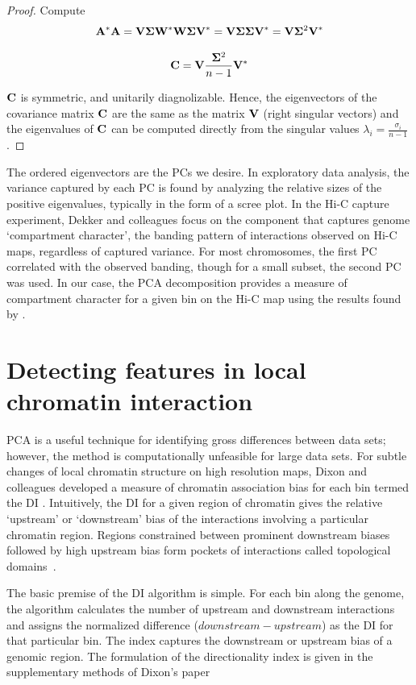 \begin{proof}
  Compute
  \[
    \mathbf{A}^*\mathbf{A} =
    \mathbf{V\Sigma}\mathbf{W}^*\mathbf{W\Sigma}\mathbf{V}^* =
    \mathbf{V\Sigma\Sigma}\mathbf{V}^* =
    \mathbf{V}\mathbf{\Sigma}^2\mathbf{V}^*
  \]

  \[
    \mathbf{C} = \mathbf{V}\frac{\mathbf{\Sigma}^2}{n - 1}\mathbf{V}^*
  \]

  $\mathbf{C}$ is symmetric, and unitarily diagnolizable.  Hence, the eigenvectors of the covariance matrix $\mathbf{C}$ are the same as the
  matrix $\mathbf{V}$ (right singular vectors) and the eigenvalues of $\mathbf{C}$ can be computed directly from the singular values
  $\lambda_i = \frac{\sigma_i}{n - 1}$.
\end{proof}

The ordered eigenvectors are the \glspl{PC} we desire.  In exploratory data analysis, the variance captured by each \gls{PC} is found
by analyzing the relative sizes of the positive eigenvalues, typically in the form of a scree plot.  In the Hi-C capture experiment, Dekker
and colleagues \citep{dekker2012} focus on the component that captures genome `compartment character', the banding pattern of interactions
observed on Hi-C maps, regardless of captured variance.  For most chromosomes, the first \gls{PC} correlated with the observed banding, though
for a small subset, the second \gls{PC} was used.  In our case, the \gls{PCA} decomposition provides a measure of compartment character
for a given bin on the Hi-C map using the results found by \citet{dekker2012}.

\section*{Detecting features in local chromatin interaction}

\gls{PCA} is a useful technique for identifying gross differences between data sets; however, the method is computationally unfeasible for large
data sets.  For subtle changes of local chromatin structure on high resolution maps, Dixon and colleagues developed a measure of chromatin
association bias for each bin termed the \gls{DI} \citep{dixon2012}.  Intuitively, the \gls{DI} for a given region of chromatin gives the
relative `upstream' or `downstream' bias of the interactions involving a particular chromatin region.  Regions constrained between prominent
downstream biases followed by high upstream bias form pockets of interactions called topological domains~\cite{dixon2012}.

The basic premise of the \gls{DI} algorithm is simple.  For each bin along the genome, the algorithm calculates the number of upstream and downstream
interactions and assigns the normalized difference ($downstream - upstream$) as the \gls{DI} for that particular bin.  The index captures the
downstream or upstream bias of a genomic region. The formulation of the directionality index is given in the supplementary methods
of Dixon's paper \citep{dixon2012}

